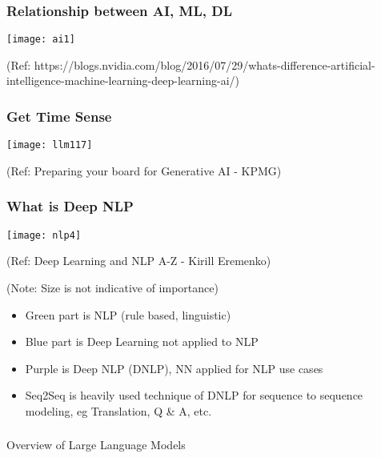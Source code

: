 \begin{frame}[fragile]\frametitle{Relationship between AI, ML, DL}
\begin{center}
\texttt{[image: ai1]}
\end{center}
{\tiny (Ref: https://blogs.nvidia.com/blog/2016/07/29/whats-difference-artificial-intelligence-machine-learning-deep-learning-ai/)}
\end{frame}

\begin{frame}[fragile]\frametitle{Get Time Sense}
\begin{center}
\texttt{[image: llm117]}
\end{center}

{\tiny (Ref: Preparing your board for Generative AI - KPMG)}
\end{frame}

\begin{frame}[fragile]\frametitle{What is Deep NLP}
\begin{center}
\texttt{[image: nlp4]}

\tiny{(Ref: Deep Learning and NLP A-Z - Kirill Eremenko)}

\tiny{(Note: Size is not indicative of importance)}
\end{center}

	\begin{itemize}
	\item Green part is NLP (rule based, linguistic)
	\item Blue part is Deep Learning not applied to NLP
	\item Purple is Deep NLP (DNLP), NN applied for NLP use cases
	\item Seq2Seq is heavily used technique of DNLP for sequence to sequence modeling, eg Translation, Q \& A, etc.
	\end{itemize}
	

\end{frame}


\begin{frame}[fragile]\frametitle{}
\begin{center}
{\Large Overview of Large Language Models}
\end{center}
\end{frame}



